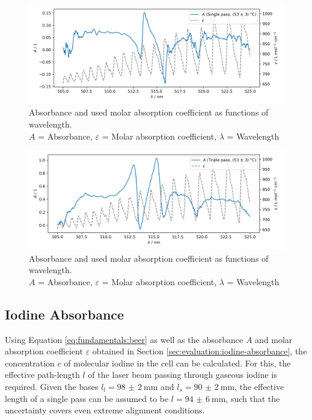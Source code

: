 \begin{figure}[H]
    \centering
    \includegraphics[width=\textwidth]{graphics/absorbance-60.png}
    \caption{Absorbance and used molar absorption coefficient as functions of wavelength.\\
        $A$ = Absorbance, $\varepsilon$ = Molar absorption coefficient, $\lambda$ = Wavelength}
    \label{fig:evaluation:absorbance:single:3}
\end{figure}

\begin{figure}[H]
    \centering
    \includegraphics[width=\textwidth]{graphics/absorbance-triple.png}
    \caption{Absorbance and used molar absorption coefficient as functions of wavelength.\\
        $A$ = Absorbance, $\varepsilon$ = Molar absorption coefficient, $\lambda$ = Wavelength}
    \label{fig:evaluation:absorbance:triple}
\end{figure}

\subsection{Iodine Absorbance}
\label{sec:evaluation:iodine-concentration}

Using Equation \ref{eq:fundamentals:beer} as well as the absorbance $A$ and molar absorption coefficient $\varepsilon$ obtained in Section \ref{sec:evaluation:iodine-absorbance}, the concentration $c$ of molecular iodine in the cell can be calculated.
For this, the effective path-length $l$ of the laser beam passing through gaseous iodine is required. Given the bases $l_l = \SI{98(2)}{\mm}$ and $l_s = \SI{90(2)}{\mm}$, the effective length of a single pass can be assumed to be $l = \SI{94(6)}{\mm}$, such that the uncertainty covers even extreme alignment conditions.

